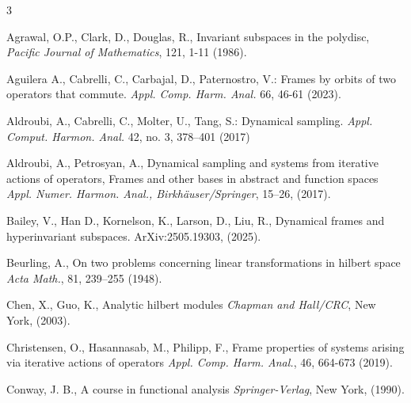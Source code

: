 \documentclass[12pt,reqno]{amsart}
\theoremstyle{definition}
\theoremstyle{definition}
\numberwithin{equation}{section}
\begin{document}
\begin{thebibliography}{3}

 Agrawal, O.P., Clark, D., Douglas, R., Invariant subspaces in the polydisc, {\it Pacific Journal of Mathematics}, 121, 1-11 (1986).

Aguilera A., Cabrelli, C., Carbajal, D., Paternostro, V.: Frames by orbits of two operators that commute. {\it Appl. Comp. Harm. Anal.} 66, 46-61 (2023).

  Aldroubi, A., Cabrelli,  C., Molter, U.,  Tang, S.: Dynamical sampling. \textsl{Appl. Comput. Harmon. Anal.} 42, no. 3, 378–401 (2017)



 Aldroubi, A., Petrosyan, A., Dynamical sampling and systems from iterative actions of operators, Frames and other bases in abstract and function spaces {\it Appl. Numer. Harmon. Anal., Birkhäuser/Springer}, 15–26, (2017).

 Bailey, V., Han D., Kornelson, K., Larson, D., Liu, R., Dynamical frames and hyperinvariant subspaces. ArXiv:2505.19303, (2025).

 Beurling, A., On two problems concerning linear transformations in hilbert space {\it Acta Math.}, 81, 239–255 (1948).

 Chen, X., Guo, K., Analytic hilbert modules {\it Chapman and Hall/CRC}, New York, (2003). 


 Christensen, O., Hasannasab, M., Philipp, F., Frame properties of systems arising via iterative actions of operators {\it Appl. Comp. Harm. Anal.}, 46, 664-673 (2019).


 Conway, J. B., A course in functional analysis {\it Springer-Verlag}, New York, (1990).


\end{thebibliography}
\end{document}
